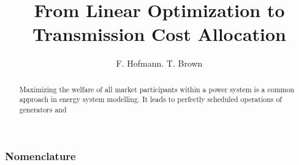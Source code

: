 \documentclass[11pt,twocolumn]{article}
\begin{document}
\title{From Linear Optimization to Transmission Cost Allocation}
\author{F. Hofmann. T. Brown}

\maketitle

\begin{abstract}
Maximizing the welfare of all market participants within a power system is a common approach in energy system modelling. It leads to perfectly scheduled operations of generators and  
\end{abstract}






\subsubsection*{Nomenclature}
\end{document}
